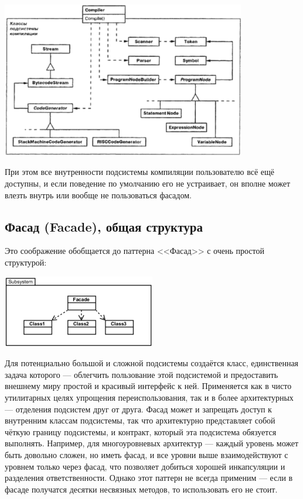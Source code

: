 \documentclass{../text-style}
\begin{document}
\begin{center}
    \includegraphics[width=0.8\textwidth]{facadeMotivation.png}
\end{center}

При этом все внутренности подсистемы компиляции пользователю всё ещё доступны, и если поведение по умолчанию его не устраивает, он вполне может влезть внутрь или вообще не пользоваться фасадом.

\subsection{Фасад (Facade), общая структура}

Это соображение обобщается до паттерна <<Фасад>> с очень простой структурой:

\begin{center}
    \includegraphics[width=0.5\textwidth]{facade.png}
\end{center}

Для потенциально большой и сложной подсистемы создаётся класс, единственная задача которого --- облегчить пользование этой подсистемой и предоставить внешнему миру простой и красивый интерфейс к ней. Применяется как в чисто утилитарных целях упрощения переиспользования, так и в более архитектурных --- отделения подсистем друг от друга. Фасад может и запрещать доступ к внутренним классам подсистемы, так что архитектурно представляет собой чёткую границу подсистемы, и контракт, который эта подсистема обязуется выполнять. Например, для многоуровневых архитектур --- каждый уровень может быть довольно сложен, но иметь фасад, и все уровни выше взаимодействуют с уровнем только через фасад, что позволяет добиться хорошей инкапсуляции и разделения ответственности. Однако этот паттерн не всегда применим --- если в фасаде получатся десятки несвязных методов, то использовать его не стоит.
\end{document}
